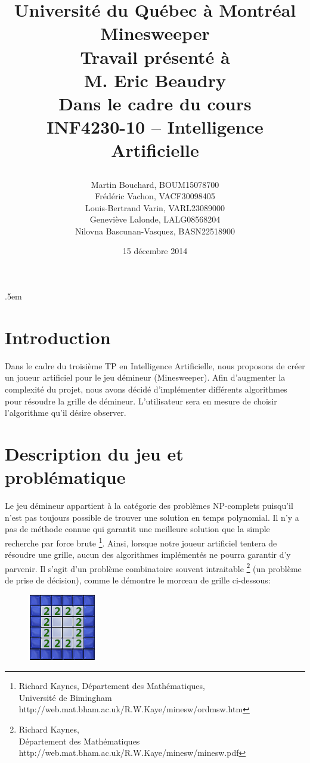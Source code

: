 \documentclass{article}
\title{%
\Large{Université du Québec à Montréal}\\
\vspace{2.5cm}
\Huge{Minesweeper}\\
\vspace{3cm}
\Large{Travail présenté à \\M. Eric Beaudry} \\
\vspace{2cm}
\Large{Dans le cadre du cours \\INF4230-10 – Intelligence Artificielle} \\
\vspace{1cm}
\author{Martin Bouchard, BOUM15078700\\Frédéric Vachon, VACF30098405\\Louis-Bertrand Varin,
VARL23089000\\Geneviève Lalonde, LALG08568204\\Nilovna Bascunan-Vasquez, BASN22518900}
\date{\vspace{0.5cm} 15 décembre 2014}
\vfill
}
\begin{document}
\maketitle

\thispagestyle{empty}
\clearpage

\openup .5em

\section{Introduction}
Dans le cadre du troisième TP en Intelligence Artificielle, nous proposons de créer 
un joueur artificiel pour le jeu démineur (Minesweeper). Afin d’augmenter la complexité 
du projet, nous avons décidé d’implémenter différents algorithmes pour résoudre la 
grille de démineur. L’utilisateur sera en mesure de choisir l’algorithme qu’il désire observer. 

\section{Description du jeu et problématique}
Le jeu démineur appartient à la catégorie des problèmes NP-complets puisqu’il n’est 
pas toujours possible de trouver une solution en temps polynomial. Il n’y a pas de 
méthode connue qui garantit une meilleure solution que la simple recherche par force 
brute \footnote{Richard Kaynes, Département des Mathématiques, \\ Université de Bimingham http://web.mat.bham.ac.uk/R.W.Kaye/minesw/ordmsw.htm}. 
Ainsi, lorsque notre joueur artificiel tentera de résoudre une grille, aucun 
des algorithmes implémentés ne pourra garantir d’y parvenir. Il s’agit d’un problème 
combinatoire souvent intraitable \footnote{Richard Kaynes, \\ Département des Mathématiques http://web.mat.bham.ac.uk/R.W.Kaye/minesw/minesw.pdf} 
(un problème de prise de décision), comme le démontre le morceau de grille ci-dessous:

\begin{figure}[h!]
  \centering
  \includegraphics[scale=.5]{./demineur_1.png}
\end{figure}
\end{document}
